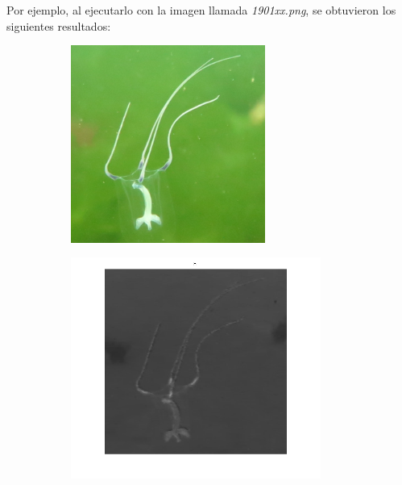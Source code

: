 \documentclass{article}
\begin{document}
Por ejemplo, al ejecutarlo con la imagen llamada \textit{1901xx.png}, se obtuvieron los siguientes resultados:

\begin{figure}[H]
	\begin{subfigure}{0.5\textwidth}
	\centering
        \includegraphics[width=0.7\textwidth]{1901xx.png}
    \end{subfigure}\hfill
	\begin{subfigure}{0.5\textwidth}
	\centering
        \includegraphics[width=0.9\textwidth]{1901-hsi-h.png}
    \end{subfigure}\hfill
	\begin{subfigure}{0.5\textwidth}

\end{subfigure}
\end{figure}
\end{document}
